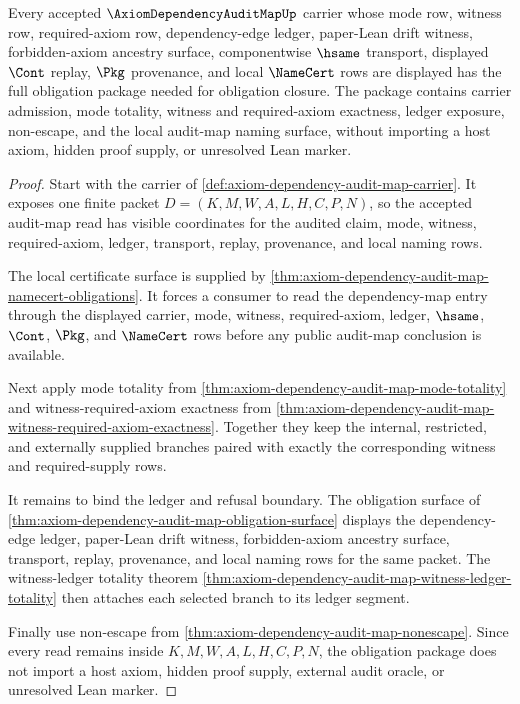 \begin{theorem}
\label{thm:axiom-dependency-audit-map-obligation-closure}
Every accepted $\AxiomDependencyAuditMapUp$ carrier whose mode row, witness row, required-axiom row, dependency-edge ledger, paper-Lean drift witness, forbidden-axiom ancestry surface, componentwise $\hsame$ transport, displayed $\Cont$ replay, $\Pkg$ provenance, and local $\NameCert$ rows are displayed has the full obligation package needed for obligation closure. The package contains carrier admission, mode totality, witness and required-axiom exactness, ledger exposure, non-escape, and the local audit-map naming surface, without importing a host axiom, hidden proof supply, or unresolved Lean marker.
\end{theorem}
\begin{proof}
Start with the carrier of \autoref{def:axiom-dependency-audit-map-carrier}. It exposes one finite packet $D=(K,M,W,A,L,H,C,P,N)$, so the accepted audit-map read has visible coordinates for the audited claim, mode, witness, required-axiom, ledger, transport, replay, provenance, and local naming rows.

The local certificate surface is supplied by \autoref{thm:axiom-dependency-audit-map-namecert-obligations}. It forces a consumer to read the dependency-map entry through the displayed carrier, mode, witness, required-axiom, ledger, $\hsame$, $\Cont$, $\Pkg$, and $\NameCert$ rows before any public audit-map conclusion is available.

Next apply mode totality from \autoref{thm:axiom-dependency-audit-map-mode-totality} and witness-required-axiom exactness from \autoref{thm:axiom-dependency-audit-map-witness-required-axiom-exactness}. Together they keep the internal, restricted, and externally supplied branches paired with exactly the corresponding witness and required-supply rows.

It remains to bind the ledger and refusal boundary. The obligation surface of \autoref{thm:axiom-dependency-audit-map-obligation-surface} displays the dependency-edge ledger, paper-Lean drift witness, forbidden-axiom ancestry surface, transport, replay, provenance, and local naming rows for the same packet. The witness-ledger totality theorem \autoref{thm:axiom-dependency-audit-map-witness-ledger-totality} then attaches each selected branch to its ledger segment.

Finally use non-escape from \autoref{thm:axiom-dependency-audit-map-nonescape}. Since every read remains inside $K,M,W,A,L,H,C,P,N$, the obligation package does not import a host axiom, hidden proof supply, external audit oracle, or unresolved Lean marker.
\end{proof}

